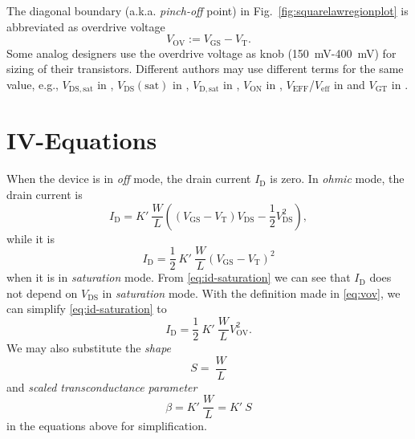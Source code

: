 \documentclass{article}[11pt]
\begin{document}
The diagonal boundary  (a.k.a. \textit{pinch-off} point) in
Fig.~\ref{fig:squarelawregionplot} is abbreviated as overdrive voltage
\begin{equation}\label{eq:vov}
  V_{\mathrm{OV}} := V_{\mathrm{GS}}-V_{\mathrm{T}}.
\end{equation}
Some analog designers use the overdrive voltage as knob 
(\SI{150}{\milli\volt}-\SI{400}{\milli\volt}) for sizing of their transistors.
Different authors may use different terms for the same value,
e.g., $V_{\mathrm{DS,sat}}$ in \cite{baker-cmoscircdesnsim-10}, 
$V_{\mathrm{DS}}(\mathrm{sat})$ in \cite{allen-cmosancirdes-12},
$V_{\mathrm{D,sat}}$ in \cite{razavi-desanacmosic-15}, 
$V_{\mathrm{ON}}$ in \cite{allen-cmosancirdes-12},
$V_{\mathrm{EFF}}$/$V_{\mathrm{eff}}$ in 
\cite{binkley-tradeoffoptanalogcmos-08,johnsmartin-aicd-12} and
$V_{\mathrm{GT}}$ in \cite{huijsing-opamp-17}.

\section{IV-Equations}

When the device is in \textit{off} mode, the drain current $I_{\mathrm{D}}$
is zero.
In \textit{ohmic} mode, the drain current is
\begin{equation}\label{eq:id-ohmic}
  I_{\mathrm{D}} =  K' \ \frac{W}{L} 
    \left((V_{\mathrm{GS}}-V_{\mathrm{T}})V_{\mathrm{DS}} 
      - \frac{1}{2} V_{\mathrm{DS}}^2\right),
\end{equation}
while it is 
\begin{equation}\label{eq:id-saturation}
  I_{\mathrm{D}} = \frac{1}{2} \ K' \ \frac{W}{L} (V_{\mathrm{GS}}-V_{\mathrm{T}})^2
\end{equation}
when it is in \textit{saturation} mode.
From \eqref{eq:id-saturation} we can see that $I_{\mathrm{D}}$ does 
not depend on $V_{\mathrm{DS}}$ in \textit{saturation} mode.
With the definition made in \eqref{eq:vov}, we can simplify 
\eqref{eq:id-saturation} to
\begin{equation}\label{eq:id-saturation-vov}
I_{\mathrm{D}} = \frac{1}{2} \ K' \ \frac{W}{L} V_{\mathrm{OV}}^2.
\end{equation}
We may also substitute the \textit{shape}
\begin{equation}\label{eq:shape}
S = \ \frac{W}{L}
\end{equation}
and \textit{scaled transconductance parameter}
\begin{equation}\label{eq:beta}
\beta = K' \ \frac{W}{L} = K' \ S
\end{equation}
in the equations above for simplification.
\end{document}
